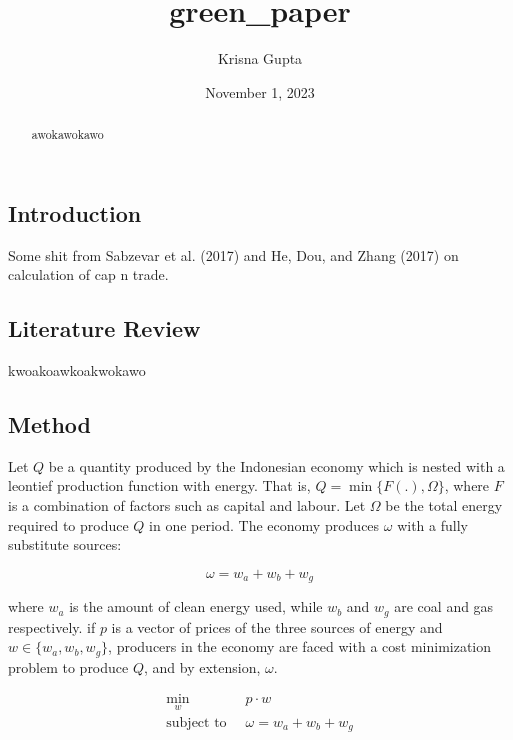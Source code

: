 \documentclass[
  a4paper,
  DIV=11,
  numbers=noendperiod]{scrartcl}
\title{green\_paper}
\author{Krisna Gupta}
\date{November 1, 2023}
\begin{document}
\maketitle
\begin{abstract}
awokawokawo
\end{abstract}
\ifdefined\Shaded\renewenvironment{Shaded}{\begin{tcolorbox}[interior hidden, sharp corners, frame hidden, boxrule=0pt, borderline west={3pt}{0pt}{shadecolor}, breakable, enhanced]}{\end{tcolorbox}}\fi

\hypertarget{introduction}{%
\subsection{Introduction}\label{introduction}}

Some shit from Sabzevar et al. (2017) and He, Dou, and Zhang (2017) on
calculation of cap n trade.

\hypertarget{literature-review}{%
\subsection{Literature Review}\label{literature-review}}

kwoakoawkoakwokawo

\hypertarget{method}{%
\subsection{Method}\label{method}}

Let \(Q\) be a quantity produced by the Indonesian economy which is
nested with a leontief production function with energy. That is,
\(Q=\min \{F(.),\Omega\}\), where \(F\) is a combination of factors such
as capital and labour. Let \(\Omega\) be the total energy required to
produce \(Q\) in one period. The economy produces \(\omega\) with a
fully substitute sources:

\[
\omega=w_a+w_b+w_g
\]

where \(w_a\) is the amount of clean energy used, while \(w_b\) and
\(w_g\) are coal and gas respectively. if \(p\) is a vector of prices of
the three sources of energy and \(w \in \{w_a,w_b,w_g\}\), producers in
the economy are faced with a cost minimization problem to produce \(Q\),
and by extension, \(\omega\).

\[
\begin{aligned}
\min_{w} \ &  p \cdot w \\
\mbox{subject to } \ & \omega=w_a+w_b+w_g
\end{aligned}
\]
\end{document}
